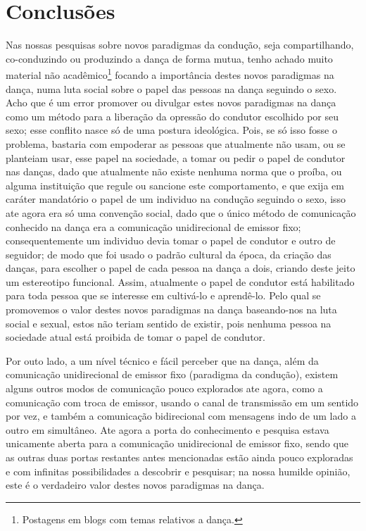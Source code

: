 \documentclass[a4paper,10pt]{article}
\begin{document}
\section{Conclusões}
Nas nossas pesquisas sobre novos paradigmas da condução, seja compartilhando, 
co-conduzindo ou produzindo a dança de forma mutua, 
tenho achado muito material não 
acadêmico\footnote{Postagens em blogs com temas relativos a dança.} 
focando a importância destes novos paradigmas na dança, 
numa luta social sobre o papel das pessoas na dança seguindo o sexo.
Acho que é um error promover ou divulgar estes novos paradigmas na dança 
como um método para a liberação da opressão do condutor escolhido por seu sexo;
esse conflito nasce só de uma postura ideológica. 
Pois, se só isso fosse o problema, 
bastaria com empoderar as pessoas que atualmente não usam, 
ou se planteiam usar, esse papel na sociedade, 
a tomar ou pedir o papel de condutor nas danças, 
dado que atualmente não existe nenhuma norma que o proíba,
ou alguma instituição que regule ou sancione este comportamento,
e que exija em caráter mandatório o papel de um individuo na condução seguindo o sexo,
isso ate agora era só uma convenção social, 
dado que o único método de comunicação conhecido na dança era a comunicação unidirecional de emissor fixo;
consequentemente um individuo devia tomar o papel de condutor e outro de seguidor;
de modo que foi usado o padrão cultural da época, da criação das danças, 
para escolher o papel de cada pessoa na dança a dois,
criando deste jeito um estereotipo funcional. 
Assim, atualmente o papel de condutor está habilitado para toda pessoa que se interesse em 
cultivá-lo e aprendê-lo. 
Pelo qual se promovemos o valor destes novos paradigmas na dança baseando-nos na luta social e sexual, 
estos não teriam sentido de existir, 
pois nenhuma pessoa na sociedade atual está proibida de tomar o papel de condutor.

Por outo lado, a um nível técnico e fácil perceber que na dança, além da comunicação 
unidirecional de emissor fixo  (paradigma da condução),
existem alguns outros modos de comunicação pouco explorados ate agora,
como a comunicação com troca de emissor, 
usando o canal de transmissão em um sentido por vez,
e também a comunicação bidirecional com mensagens indo de um lado a outro em simultâneo.
Ate agora a porta do conhecimento e pesquisa estava unicamente aberta para a 
comunicação unidirecional de emissor fixo, 
sendo que as outras duas portas restantes antes mencionadas estão ainda pouco 
exploradas e com infinitas possibilidades a descobrir e pesquisar; 
na nossa humilde opinião, este é o verdadeiro valor destes novos paradigmas na dança. 
\end{document}
